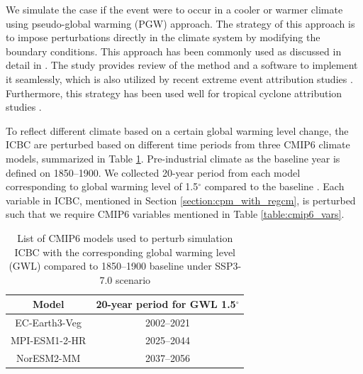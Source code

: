 We simulate the case if the event were to occur in a cooler or warmer climate using pseudo-global warming (PGW) approach. The strategy of this approach is to impose perturbations directly in the climate system by modifying the boundary conditions. This approach has been commonly used as discussed in detail in \citet{brogli2023pseudo}. The study provides review of the method and a software to implement it seamlessly, which is also utilized by recent extreme event attribution studies \citep{calvo2026human}. Furthermore, this strategy has been used well for tropical cyclone attribution studies \citep{patricola2018anthropogenic}.

To reflect different climate based on a certain global warming level change, the ICBC are perturbed based on different time periods from three CMIP6 climate models, summarized in Table \ref{table:cmip6}. Pre-industrial climate as the baseline year is defined on 1850--1900. We collected 20-year period from each model corresponding to global warming level of 1.5$^\circ$ compared to the baseline \citep{hauser2022transient}. Each variable in ICBC, mentioned in Section \ref{section:cpm_with_regcm}, is perturbed such that we require CMIP6 variables mentioned in Table \ref{table:cmip6_vars}.



\begin{table}[h] 
\centering
\begin{tabular}{cc} 
\hline
\textbf{Model} & \textbf{20-year period for GWL 1.5$^\circ$} \\
\hline
EC-Earth3-Veg & 2002--2021 \\
MPI-ESM1-2-HR & 2025--2044 \\
NorESM2-MM & 2037--2056 \\
\hline
\end{tabular}
\caption{List of CMIP6 models used to perturb simulation ICBC with the corresponding global warming level (GWL) compared to 1850--1900 baseline under SSP3-7.0 scenario \citep{hauser2022transient}}
\label{table:cmip6}
\end{table}

